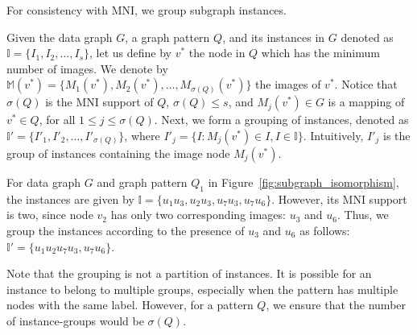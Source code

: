For consistency with MNI, we group subgraph instances.
%
\begin{defn}
\label{def:instance_grouping}
Given the data graph $G$, a graph pattern $Q$, and its instances in $G$ denoted as $\mathbb{I}=\{I_1,I_2,\ldots,I_s\}$,
let us define by $v^*$ the node in $Q$ which has the minimum number of images. We denote by
$\mathbb{M}(v^*)=\{M_1(v^*),M_2(v^*),\ldots,M_{\sigma(Q)}(v^*)\}$ the images of $v^*$. Notice that
$\sigma(Q)$ is the MNI support of $Q$, $\sigma(Q)\le s$, and $M_j(v^*)\in G$ is
a mapping of $v^*\in Q$, for all $1 \le j \le \sigma(Q)$. Next, we form a grouping
of instances, denoted as $\mathbb{I'}=\{I'_1,I'_2,\ldots,I'_{\sigma(Q)}\}$, where
$I'_j= \{I:M_j(v^*) \in I, I \in \mathbb{I}\}$. Intuitively,
$I'_j$ is the group of instances containing the image node $M_j(v^*)$.
\end{defn}
%
\begin{exple}
For data graph $G$ and graph pattern $Q_1$ in Figure~\ref{fig:subgraph_isomorphism},
the instances are
given by $\mathbb{I}=\{u_1u_3,u_2u_3,u_7u_3,u_7u_6\}$. However, its MNI support is two, since
node $v_2$ has only two corresponding images: $u_3$ and $u_6$. Thus, we group the instances
according to the presence of $u_3$ and $u_6$ as follows: $\mathbb{I'}=\{u_1u_2u_7u_3,u_7u_6\}$.
\end{exple}
%

Note that the grouping is not a partition of instances. It is possible for an instance
to belong to multiple groups, especially when the pattern has multiple nodes with the same label.
However, for a pattern $Q$, we ensure that the number of instance-groups would be $\sigma(Q)$.

